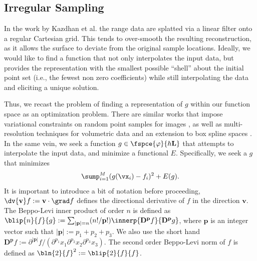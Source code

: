 \subsection{Irregular Sampling}
\label{sec:vari_review}
In the work by Kazdhan et al. \cite{fftk} the range data are splatted via a linear filter onto a regular Cartesian grid. This tends to over-smooth the resulting reconstruction, as it allows the surface to deviate from the original sample locations. Ideally, we would like to find a function that not only interpolates the input data, but provides the representation with the smallest possible ``shell'' about the initial point set (i.e., the fewest non zero coefficients) while still interpolating the data and eliciting a unique solution. 

Thus, we recast the problem of finding a representation of $g$ within our function space as an optimization problem. There are similar works that impose variational constraints on random point samples for images \cite{variational}, as well as multi-resolution techniques for volumetric data \cite{onvari} and an extension to box spline spaces \cite{xu2012rec}. In the same vein, we seek a function $g \in \fspce{\varphi}{h\mathbf{L}}$ that attempts to interpolate the input data, and minimize a functional $E$. Specifically, we seek a $g$ that minimizes {\small 
\begin{equation} \label{eq:minexp}
 	\sump_{i=1}^{M} (g(\vx_i) -  f_i)^2 + E(g).
\end{equation}}
It is important to introduce a bit of notation before proceeding, $\dv{\mathbf{v}} f := \mathbf{v} \cdot \grad f$ defines the directional derivative of $f$ in the direction $\mathbf{v}$. The Beppo-Levi inner product of order $n$ is defined as $\blip{n}{f}{g}:= \sum_{|\mathbf{p}|=n}({n!}/{\mathbf{p}!}) \innerp{\mathbf{D^p}f}{\mathbf{D^p}g}$, where $\mathbf{p}$ is an integer vector such that $\left| \mathbf{p}\right| := p_1 + p_2 + p_3 $. We also use the short hand $\mathbf{D^p}f := \partial^{\left| \mathbf{p}\right|}f/({\partial^{p_1}x_1}{\partial^{p_2}x_2}{\partial^{p_3}x_3}).$ The second order Beppo-Levi norm of $f$ is defined as $\bln{2}{f}^2:=\blip{2}{f}{f}$.

